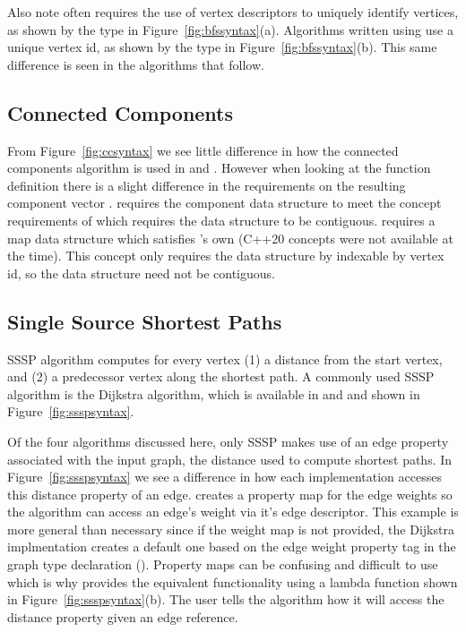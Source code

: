 
Also note \bgl often requires the use of vertex descriptors to uniquely
identify vertices, as shown by the 
type in Figure~\ref{fig:bfssyntax}(a).
Algorithms written using \stdgraph use a unique vertex id, as shown by the
 type in Figure~\ref{fig:bfssyntax}(b).
This same difference is seen in the algorithms that follow.

\subsection{Connected Components}
From Figure~\ref{fig:ccsyntax} we see little difference in how the connected components
algorithm is used in \stdgraph and \bgl.
However when looking at the function definition there is a slight difference in the
requirements on the resulting component vector .
\stdgraph requires the component data structure to meet the concept requirements
of  which requires the data structure to be contiguous.
\bgl requires a map data structure which satisfies \bgl's own 
(C++20 concepts were not available at the time).
This concept only requires the data structure by indexable by vertex id, so the data structure
need not be contiguous.

\subsection{Single Source Shortest Paths}
SSSP algorithm computes for
every vertex (1) a distance from the start vertex, and (2) a predecessor
vertex along the shortest path.
A commonly used SSSP algorithm is the Dijkstra algorithm, which is available
in \bgl and \stdgraph and shown in Figure~\ref{fig:ssspsyntax}.

Of the four algorithms discussed here, only SSSP makes use of an
edge property associated with the input graph, the distance used
to compute shortest paths.
In Figure~\ref{fig:ssspsyntax} we see a difference in how
each implementation accesses this distance property of an edge.
\bgl creates a property map for the edge weights so the algorithm
can access an edge's weight via it's edge descriptor.
This \bgl example is more general than necessary since
if the weight map is not provided, the Dijkstra implmentation
creates a default one based on the edge weight property tag
in the graph type declaration ().
Property maps can be confusing and difficult to use which is
why \stdgraph provides the equivalent functionality using a lambda
function shown in Figure~\ref{fig:ssspsyntax}(b).
The user tells the algorithm how it will access the distance property
given an edge reference.

